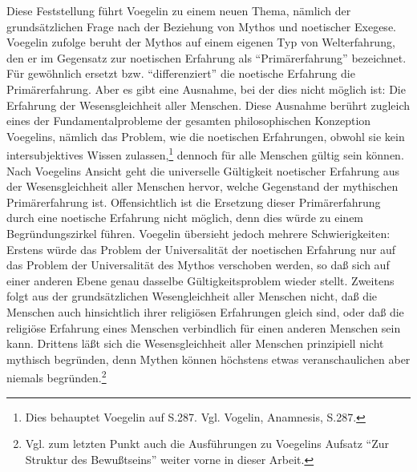 Diese Feststellung führt Voegelin zu einem neuen Thema, nämlich der
grundsätzlichen Frage nach der Beziehung von Mythos und noetischer Exegese.
Voegelin zufolge beruht der Mythos auf einem eigenen Typ von Welterfahrung,
den er im Gegensatz zur noetischen Erfahrung als "`Primärerfahrung"'
bezeichnet. Für gewöhnlich ersetzt bzw. "`differenziert"' die noetische
Erfahrung die Primärerfahrung.  Aber es gibt eine Ausnahme, bei der dies nicht
möglich ist: Die Erfahrung der Wesensgleichheit aller Menschen. Diese Ausnahme
berührt zugleich eines der Fundamentalprobleme der gesamten philosophischen
Konzeption Voegelins, nämlich das Problem, wie die noetischen Erfahrungen,
obwohl sie kein intersubjektives Wissen zulassen,\footnote{Dies behauptet
  Voegelin auf S.287. Vgl. Vogelin, Anamnesis, S.287.} dennoch für alle
Menschen gültig sein können. Nach Voegelins Ansicht geht die universelle
Gültigkeit noetischer Erfahrung aus der Wesensgleichheit aller Menschen
hervor, welche Gegenstand der mythischen Primärerfahrung ist. Offensichtlich
ist die Ersetzung dieser Primärerfahrung durch eine noetische Erfahrung nicht
möglich, denn dies würde zu einem Begründungszirkel führen. Voegelin übersieht
jedoch mehrere Schwierigkeiten: Erstens würde das Problem der Universalität
der noetischen Erfahrung nur auf das Problem der Universalität des Mythos
verschoben werden, so daß sich auf einer anderen Ebene genau dasselbe
Gültigkeitsproblem wieder stellt. Zweitens folgt aus der grundsätzlichen
Wesengleichheit aller Menschen nicht, daß die Menschen auch hinsichtlich ihrer
religiösen Erfahrungen gleich sind, oder daß die religiöse Erfahrung eines
Menschen verbindlich für einen anderen Menschen sein kann. Drittens läßt sich
die Wesensgleichheit aller Menschen prinzipiell nicht mythisch begründen, denn
Mythen können höchstens etwas veranschaulichen aber niemals
begründen.\footnote{Vgl. zum letzten Punkt auch die Ausführungen zu Voegelins
  Aufsatz "`Zur Struktur des Bewußtseins"' weiter vorne in dieser Arbeit.}
 
